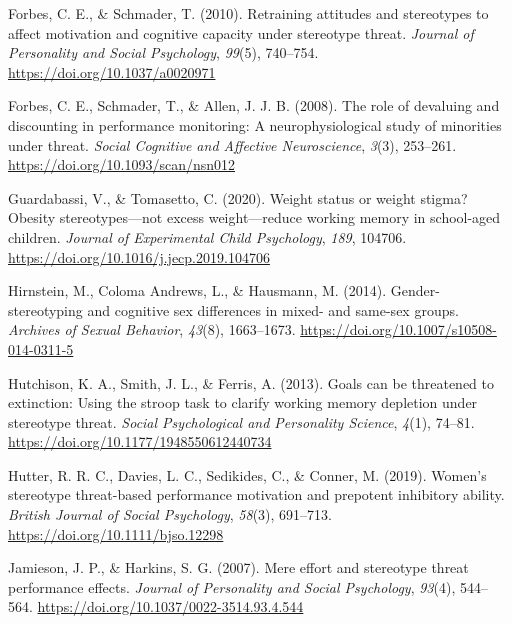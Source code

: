 \documentclass[
  doc, a4paper]{apa7}
\newlength{\cslhangindent}
\newenvironment{CSLReferences}[2] %
 {\begin{list}{}{%
  \setlength{\itemindent}{0pt}
  \setlength{\leftmargin}{0pt}
  \setlength{\parsep}{0pt}
  \ifodd #1
   \setlength{\leftmargin}{\cslhangindent}
   \setlength{\itemindent}{-1\cslhangindent}
  \fi
  \setlength{\itemsep}{#2\baselineskip}}}
 {\end{list}}
\begin{document}
\begin{CSLReferences}{1}{0}
Forbes, C. E., \& Schmader, T. (2010). Retraining attitudes and stereotypes to affect motivation and cognitive capacity under stereotype threat. \emph{Journal of Personality and Social Psychology}, \emph{99}(5), 740--754. \url{https://doi.org/10.1037/a0020971}

Forbes, C. E., Schmader, T., \& Allen, J. J. B. (2008). The role of devaluing and discounting in performance monitoring: A neurophysiological study of minorities under threat. \emph{Social Cognitive and Affective Neuroscience}, \emph{3}(3), 253--261. \url{https://doi.org/10.1093/scan/nsn012}

Guardabassi, V., \& Tomasetto, C. (2020). Weight status or weight stigma? {Obesity} stereotypes---not excess weight---reduce working memory in school-aged children. \emph{Journal of Experimental Child Psychology}, \emph{189}, 104706. \url{https://doi.org/10.1016/j.jecp.2019.104706}

Hirnstein, M., Coloma Andrews, L., \& Hausmann, M. (2014). Gender-stereotyping and cognitive sex differences in mixed- and same-sex groups. \emph{Archives of Sexual Behavior}, \emph{43}(8), 1663--1673. \url{https://doi.org/10.1007/s10508-014-0311-5}

Hutchison, K. A., Smith, J. L., \& Ferris, A. (2013). Goals can be threatened to extinction: {Using} the stroop task to clarify working memory depletion under stereotype threat. \emph{Social Psychological and Personality Science}, \emph{4}(1), 74--81. \url{https://doi.org/10.1177/1948550612440734}

Hutter, R. R. C., Davies, L. C., Sedikides, C., \& Conner, M. (2019). Women's stereotype threat-based performance motivation and prepotent inhibitory ability. \emph{British Journal of Social Psychology}, \emph{58}(3), 691--713. \url{https://doi.org/10.1111/bjso.12298}

Jamieson, J. P., \& Harkins, S. G. (2007). Mere effort and stereotype threat performance effects. \emph{Journal of Personality and Social Psychology}, \emph{93}(4), 544--564. \url{https://doi.org/10.1037/0022-3514.93.4.544}


\end{CSLReferences}
\end{document}

